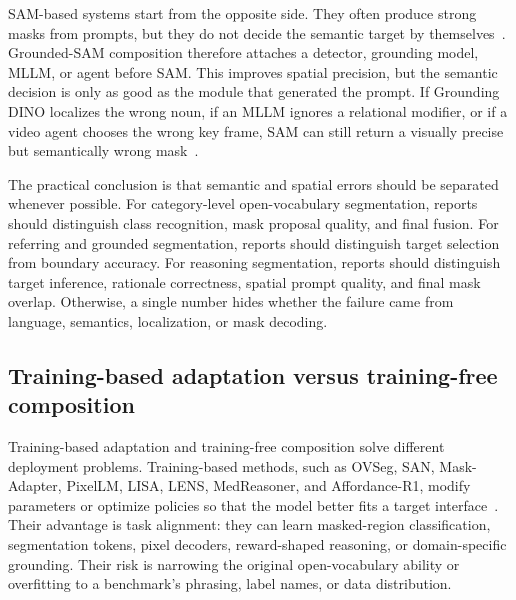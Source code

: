 SAM-based systems start from the opposite side. They often produce strong masks from prompts, but they do not decide the semantic target by themselves~\citep{kirillov2023sam,ravi2024sam2}. Grounded-SAM composition therefore attaches a detector, grounding model, MLLM, or agent before SAM. This improves spatial precision, but the semantic decision is only as good as the module that generated the prompt. If Grounding DINO localizes the wrong noun, if an MLLM ignores a relational modifier, or if a video agent chooses the wrong key frame, SAM can still return a visually precise but semantically wrong mask~\citep{liu2024groundingdino,zhouThinkYouSegment2026,huangUnleashingTemporalspatialReasoning2025}.

The practical conclusion is that semantic and spatial errors should be separated whenever possible. For category-level open-vocabulary segmentation, reports should distinguish class recognition, mask proposal quality, and final fusion. For referring and grounded segmentation, reports should distinguish target selection from boundary accuracy. For reasoning segmentation, reports should distinguish target inference, rationale correctness, spatial prompt quality, and final mask overlap. Otherwise, a single number hides whether the failure came from language, semantics, localization, or mask decoding.

\subsection{Training-based adaptation versus training-free composition}

Training-based adaptation and training-free composition solve different deployment problems. Training-based methods, such as OVSeg, SAN, Mask-Adapter, PixelLM, LISA, LENS, MedReasoner, and Affordance-R1, modify parameters or optimize policies so that the model better fits a target interface~\citep{liang2023ovseg,xu2023san,yliMaskadapterDevilMasks2025,renPixellmPixelReasoning2024,xlaiLisaReasoningSegmentation2024,zhuLensLearningSegment2026,yanMedreasonerReinforcementLearning2026,wangAffordancer1ReinforcementLearning2026}. Their advantage is task alignment: they can learn masked-region classification, segmentation tokens, pixel decoders, reward-shaped reasoning, or domain-specific grounding. Their risk is narrowing the original open-vocabulary ability or overfitting to a benchmark's phrasing, label names, or data distribution.

